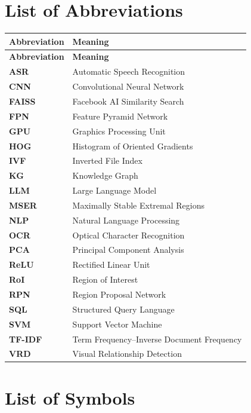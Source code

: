 \documentclass[12pt, a4paper]{report}
\begin{document}
\chapter*{List of Abbreviations}
\thispagestyle{fancy}

\begin{longtable}{>{\bfseries}p{3cm} p{10cm}}
  \toprule
  \textbf{Abbreviation} & \textbf{Meaning} \\
  \midrule
  \endfirsthead
  \toprule
  \textbf{Abbreviation} & \textbf{Meaning} \\
  \midrule
  \endhead
  ASR    & Automatic Speech Recognition \\
  CNN    & Convolutional Neural Network \\
  FAISS  & Facebook AI Similarity Search \\
  FPN    & Feature Pyramid Network \\
  GPU    & Graphics Processing Unit \\
  HOG    & Histogram of Oriented Gradients \\
  IVF    & Inverted File Index \\
  KG     & Knowledge Graph \\
  LLM    & Large Language Model \\
  MSER   & Maximally Stable Extremal Regions \\
  NLP    & Natural Language Processing \\
  OCR    & Optical Character Recognition \\
  PCA    & Principal Component Analysis \\
  ReLU   & Rectified Linear Unit \\
  RoI    & Region of Interest \\
  RPN    & Region Proposal Network \\
  SQL    & Structured Query Language \\
  SVM    & Support Vector Machine \\
  TF-IDF & Term Frequency–Inverse Document Frequency \\
  VRD    & Visual Relationship Detection \\
  \bottomrule
\end{longtable}

\newpage

\chapter*{List of Symbols}
\thispagestyle{fancy}
\end{document}

